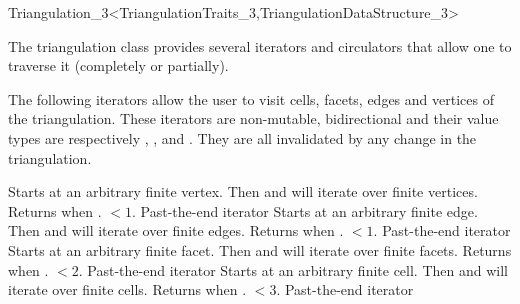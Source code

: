 \begin{ccRefClass}{Triangulation_3<TriangulationTraits_3,TriangulationDataStructure_3>}

The triangulation class provides several iterators and circulators
that allow one to traverse it (completely or partially).


The following iterators allow the user to visit cells,
facets, edges and vertices of the
triangulation. These iterators are non-mutable, bidirectional and
their value types are respectively , , 
and . They are all invalidated by any change in the
triangulation. 

{Starts at an arbitrary finite vertex. Then \ccc{++} and \ccc{--} will
iterate over finite vertices. Returns  when
\ccVar. $<1$.} 
\ccGlue
{}
{Past-the-end iterator}
\ccGlue
{}
{Starts at an arbitrary finite edge. Then \ccc{++} and \ccc{--} will
iterate over finite edges. Returns  when
\ccVar. $<1$.} 
\ccGlue
{}
{Past-the-end iterator}
\ccGlue
{}
{Starts at an arbitrary finite facet. Then \ccc{++} and \ccc{--} will
iterate over finite facets. Returns  when
\ccVar. $<2$.}
\ccGlue
{}
{Past-the-end iterator}
\ccGlue
{}
{Starts at an arbitrary finite cell. Then \ccc{++} and \ccc{--} will
iterate over finite cells. Returns  when
\ccVar. $<3$.}
\ccGlue
{}
{Past-the-end iterator}


\end{ccRefClass}
